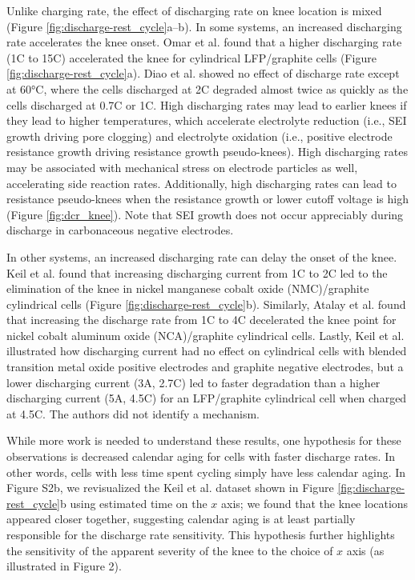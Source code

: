 \documentclass[journal=jpclcd,manuscript=article]{achemso}
\begin{document}
Unlike charging rate, the effect of discharging rate on knee location is mixed (Figure \ref{fig:discharge-rest_cycle}a--b).
In some systems, an increased discharging rate
accelerates the knee onset.
Omar et al.\cite{omar_lithium_2014} found that a higher discharging rate (1C to 15C) accelerated the knee for cylindrical LFP/graphite cells (Figure \ref{fig:discharge-rest_cycle}a).
Diao et al.\cite{diao_accelerated_2019} showed no effect of discharge rate except at 60°C, where the cells discharged at 2C degraded almost twice as quickly as the cells discharged at 0.7C or 1C.
High discharging rates may lead to earlier knees if they lead to higher temperatures, which accelerate electrolyte reduction (i.e., SEI growth driving pore clogging) and electrolyte oxidation (i.e., positive electrode resistance growth driving resistance growth pseudo-knees).
High discharging rates may be associated with mechanical stress on electrode particles as well, accelerating side reaction rates.\cite{christensen_mathematical_2006, allen_quantifying_2021, dubarry_cell_2014, sun_accelerated_2018}
Additionally, high discharging rates can lead to resistance pseudo-knees when the resistance growth or lower cutoff voltage is high (Figure \ref{fig:dcr_knee}).\cite{ma_editors_2019, mandli_analysis_2019}
Note that SEI growth does not occur appreciably during discharge in carbonaceous negative electrodes\cite{attia_electrochemical_2019, das_electrochemical_2019}.

In other systems, an increased discharging rate can delay the onset of the knee.
Keil et al.\cite{keil_linear_2019} found that increasing discharging current from 1C to 2C led to the elimination of the knee in nickel manganese cobalt oxide (NMC)/graphite cylindrical cells (Figure \ref{fig:discharge-rest_cycle}b).
Similarly, Atalay et al.\cite{atalay_theory_2020} found that increasing the discharge rate from 1C to 4C decelerated the knee point for nickel cobalt aluminum oxide (NCA)/graphite cylindrical cells.
Lastly, Keil et al.\cite{keil_charging_2016} illustrated how discharging current had no effect on cylindrical cells with blended transition metal oxide positive electrodes and graphite negative electrodes, but a lower discharging current (3A, 2.7C) led to faster degradation than a higher discharging current (5A, 4.5C) for an LFP/graphite cylindrical cell when charged at 4.5C.
The authors did not identify a mechanism. 

While more work is needed to understand these results, one hypothesis for these observations is decreased calendar aging for cells with faster discharge rates.
In other words, cells with less time spent cycling simply have less calendar aging. In Figure S2b, we revisualized the Keil et al.\cite{keil_linear_2019} dataset shown in Figure \ref{fig:discharge-rest_cycle}b using estimated time on the $x$ axis; we found that the knee locations appeared closer together, suggesting calendar aging is at least partially responsible for the discharge rate sensitivity. This hypothesis further highlights the sensitivity of the apparent severity of the knee to the choice of $x$ axis (as illustrated in Figure 2).
\end{document}
